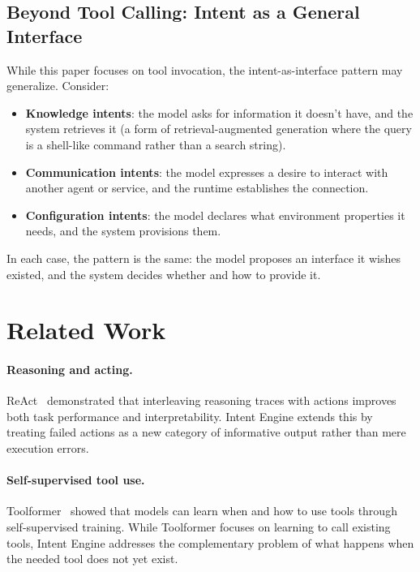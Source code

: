 \documentclass[11pt]{article}
\begin{document}
\subsection{Beyond Tool Calling: Intent as a General Interface}

While this paper focuses on tool invocation, the intent-as-interface pattern may generalize.
Consider:
\begin{itemize}[leftmargin=*]
  \item \textbf{Knowledge intents}: the model asks for information it doesn't have, and the system retrieves it (a form of retrieval-augmented generation where the query is a shell-like command rather than a search string).
  \item \textbf{Communication intents}: the model expresses a desire to interact with another agent or service, and the runtime establishes the connection.
  \item \textbf{Configuration intents}: the model declares what environment properties it needs, and the system provisions them.
\end{itemize}

In each case, the pattern is the same: the model proposes an interface it wishes existed, and the system decides whether and how to provide it.

\section{Related Work}
\label{sec:related}

\paragraph{Reasoning and acting.}
ReAct~\citep{react2022} demonstrated that interleaving reasoning traces with actions improves both task performance and interpretability. Intent Engine extends this by treating failed actions as a new category of informative output rather than mere execution errors.

\paragraph{Self-supervised tool use.}
Toolformer~\citep{toolformer2023} showed that models can learn when and how to use tools through self-supervised training. While Toolformer focuses on learning to call existing tools, Intent Engine addresses the complementary problem of what happens when the needed tool does not yet exist.
\end{document}
